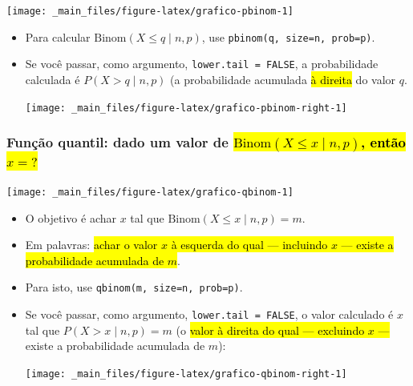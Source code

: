 \documentclass[
  11pt]{report}
\begin{document}
\begin{center}\texttt{[image: \_main\_files/figure-latex/grafico-pbinom-1]} \end{center}

\begin{itemize}
\item
  Para calcular $\text{Binom}(X \leq q \mid n, p)$, use \texttt{pbinom(q,\ size=n,\ prob=p)}.
\item
  Se você passar, como argumento, \texttt{lower.tail\ =\ FALSE}, a probabilidade calculada é $P(X>q \mid n, p)$ (a probabilidade acumulada {\hl{à direita}} do valor $q$.

  \begin{center}\texttt{[image: \_main\_files/figure-latex/grafico-pbinom-right-1]} \end{center}
\end{itemize}

\hypertarget{funuxe7uxe3o-quantil-dado-um-valor-de-textbinomx-leq-x-mid-n-p-entuxe3o-x}{%
\subsubsection*{\texorpdfstring{Função quantil: dado um valor de {\hl{$\text{Binom}(X \leq x \mid n, p)$, então $x = ?$}}}{Função quantil: dado um valor de , então }}\label{funuxe7uxe3o-quantil-dado-um-valor-de-textbinomx-leq-x-mid-n-p-entuxe3o-x}}

\begin{center}\texttt{[image: \_main\_files/figure-latex/grafico-qbinom-1]} \end{center}

\begin{itemize}
\item
  O objetivo é achar $x$ tal que $\text{Binom}(X \leq x \mid n, p) = m$.
\item
  Em palavras: {\hl{achar o valor $x$ à esquerda do qual --- incluindo $x$ --- existe a probabilidade acumulada de $m$}}.
\item
  Para isto, use \texttt{qbinom(m,\ size=n,\ prob=p)}.
\item
  Se você passar, como argumento, \texttt{lower.tail\ =\ FALSE}, o valor calculado é $x$ tal que $P(X > x \mid n, p) = m$ (o {\hl{valor à direita do qual --- excluindo $x$ ---}} existe a probabilidade acumulada de $m$):

  \begin{center}\texttt{[image: \_main\_files/figure-latex/grafico-qbinom-right-1]} \end{center}
\end{itemize}
\end{document}
